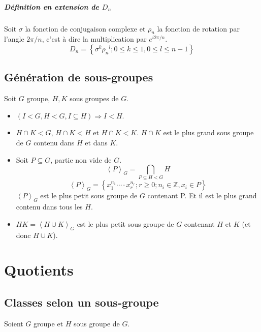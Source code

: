 \documentclass[a4paper,10pt]{report}
\newcommand{\grp}[1]{\left\langle #1 \right\rangle} %
\newcommand{\set}[1]{\left\lbrace #1 \right\rbrace } %
\newcommand{\IZ}{\mathbb{Z}} %
\newcommand{\so}{\Rightarrow}
\newcommand{\mfootnote}[1]{\up{(}\footnote{#1}\up{)}}
\begin{document}
   \paragraph{Définition en extension de $D_n$} Soit $\sigma$ la fonction de
   conjugaison complexe et $\rho_n$ la fonction de rotation par l'angle
   $2\pi/n$, c'est à dire la multiplication par $e^{i2\pi/n}$.
   $$D_n=\set{\sigma^k {\rho_n}^l;0 \leq k \leq 1, 0 \leq l \leq n-1}$$
   \begin{comment}
     \mfootnote{Preuve 26/09/08 p2}
   \end{comment}

  \section{Génération de sous-groupes}
   Soit $G$ groupe, $H,K$ sous groupes de $G$.
   \begin{itemize}
     \item $(I < G, H < G, I \subseteq H) \so I < H$.	
     \item $H \cap K < G$, $H \cap K < H$ et $ H \cap K < K$. $H \cap K$ est le
       plus grand sous groupe de $G$ contenu dans $H$ et dans $K$. 
     \item Soit $P \subseteq G$, partie non vide de $G$.
       $$\grp{P}_G = \bigcap_{P \subseteq H < G} H$$
       $$\grp{P}_G = \set{x_1^{n_1} \cdots \cdot x_r^{n_r}; r \geq 0; n_i \in
       \IZ, x_i \in P}$$
       $\grp{P}_G$ est le plus petit sous groupe de $G$ contenant P. Et il est
       le plus grand contenu dans tous les $H$.
     \item $HK = \grp{H \cup K}_G$ est le plus petit sous groupe de $G$
       contenant $H$ et $K$ (et donc $H \cup K$).
   \end{itemize}
   
  \begin{comment}
    \section{Quaternions}
     Voir cours 16/09/08 p3.
  \end{comment}

 \chapter{Quotients}
  \section{Classes selon un sous-groupe}
   Soient $G$ groupe et $H$ sous groupe de $G$.
\end{document}
